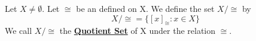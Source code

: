 \label{def:QuotientSet}
\newcommand{\QuotientSet}[0]{\textbf{\hyperref[def:QuotientSet]{Quotient Set}}\xspace}
\newcommand{\QuoSet}[2]{\ensuremath{#1/#2}\xspace}
\newcommand{\LetBeQuotientSet}[2]{
    Let \ensuremath{\QuoSet{#1}{#2}} be the \QuotientSet of \ensuremath{#1} with respect to the relation \ensuremath{#2}.
}
\begin{df}  
    Let $X \neq \emptyset$.
    Let $\cong$ be an 
	\EquivalenceRelation defined on X.
    We define the set $X/\cong$ by 
    \begin{equation}
        \QuoSet{X}{\cong} = \{ [x]_{\cong} : x \in X\}
    \end{equation}
    We call $\QuoSet{X}{\cong}$ the \QuotientSet of X under the relation $\cong$. 
\end{df} 
